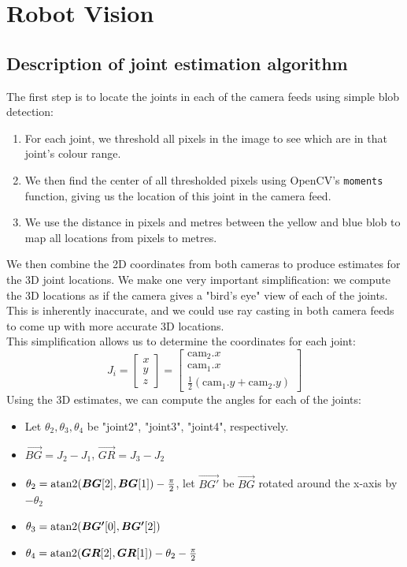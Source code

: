 \section{Robot Vision}
\subsection{Description of joint estimation algorithm} \label{joint_algo}

The first step is to locate the joints in each of the camera feeds using
simple blob detection:
\begin{enumerate}
    \item
        For each joint, we threshold all pixels in the image to see
        which are in that joint's colour range.
    \item
        We then find the center of all thresholded pixels using
        OpenCV's \texttt{moments} function, giving us the location
        of this joint in the camera feed.
    \item
        We use the distance in pixels and metres between the yellow
        and blue blob to map all locations from pixels to metres.
\end{enumerate}
We then combine the 2D coordinates from both cameras to produce
estimates for the 3D joint locations. We make one very important
simplification: we compute the 3D locations as if the camera
gives a "bird's eye" view of each of the joints.
This is inherently inaccurate, and we could use ray casting in both camera feeds
to come up with more accurate 3D locations.\\
This simplification allows us to determine the coordinates for each joint:
\[ 
    J_i = \begin{bmatrix} x \\ y \\ z \end{bmatrix} =
    \begin{bmatrix} 
        \text{cam}_2.x \\
        \text{cam}_1.x \\
        \frac{1}{2} (\text{cam}_1.y + \text{cam}_2.y)
    \end{bmatrix} 
\]
Using the 3D estimates, we can compute the angles for each of the joints:
\begin{itemize}
    \item
        Let $\theta_2, \theta_3, \theta_4$ be
        "joint2", "joint3", "joint4", respectively.
    \item $\vec{BG} = J_2 - J_1$, $\vec{GR} = J_3 - J_2$
    \item $\theta_2 = \operatorname{atan2}(\bm{BG}[2], \bm{BG}[1]) - \frac{\pi}{2}$,
        let $\vec{BG'}$ be $\vec{BG}$ rotated around the x-axis by $-\theta_2$
    \item $\theta_3 = \operatorname{atan2}(\bm{BG'}[0], \bm{BG'}[2])$
    \item $\theta_4 = \operatorname{atan2}(\bm{GR}[2],\bm{GR}[1]) - \theta_2 - \frac{\pi}{2}$
\end{itemize}

